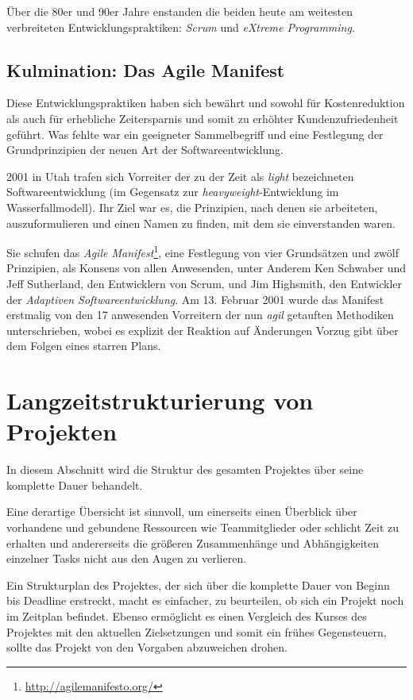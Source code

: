 		Über die 80er und 90er Jahre enstanden die beiden heute am weitesten verbreiteten Entwicklungspraktiken: \textit{Scrum} und \textit{eXtreme Programming}.
		
	\subsection{Kulmination: Das Agile Manifest}
		\label{ssec:agile}
		
		Diese Entwicklungspraktiken haben sich bewährt und sowohl für Kostenreduktion als auch für erhebliche Zeitersparnis und somit zu erhöhter Kundenzufriedenheit geführt.
		Was fehlte war ein geeigneter Sammelbegriff und eine Festlegung der Grundprinzipien der neuen Art der Softwareentwicklung.
		
		2001 in Utah trafen sich Vorreiter der zu der Zeit als \textit{light} bezeichneten Softwareentwicklung (im Gegensatz zur \textit{heavyweight}-Entwicklung im Wasserfallmodell).
		Ihr Ziel war es, die Prinzipien, nach denen sie arbeiteten, auszuformulieren und einen Namen zu finden, mit dem sie einverstanden waren.
		
		Sie schufen das \textit{Agile Manifest}\footnote{
			\url{http://agilemanifesto.org/}
		}, eine Festlegung von vier Grundsätzen und zwölf Prinzipien, als Konsens von allen Anwesenden, unter Anderem Ken Schwaber und Jeff Sutherland, den Entwicklern von Scrum, und Jim Highsmith, den Entwickler der \textit{Adaptiven Softwareentwicklung}.
		Am 13. Februar 2001 wurde das Manifest erstmalig von den 17 anwesenden Vorreitern der nun \textit{agil} getauften Methodiken unterschrieben, wobei es explizit der Reaktion auf Änderungen Vorzug gibt über dem Folgen eines starren Plans.		
		
\section{Langzeitstrukturierung von Projekten}
	\label{sec:long-term}
	In diesem Abschnitt wird die Struktur des gesamten Projektes über seine komplette Dauer behandelt.
	
	Eine derartige Übersicht ist sinnvoll, um einerseits einen Überblick über vorhandene und gebundene Ressourcen wie Teammitglieder oder schlicht Zeit zu erhalten und andererseits die größeren Zusammenhänge und Abhängigkeiten einzelner Tasks nicht aus den Augen zu verlieren.
	
	Ein Strukturplan des Projektes, der sich über die komplette Dauer von Beginn bis Deadline erstreckt, macht es einfacher, zu beurteilen, ob sich ein Projekt noch im Zeitplan befindet.
	Ebenso ermöglicht es einen Vergleich des Kurses des Projektes mit den aktuellen Zielsetzungen und somit ein frühes Gegensteuern, sollte das Projekt von den Vorgaben abzuweichen drohen.
	
